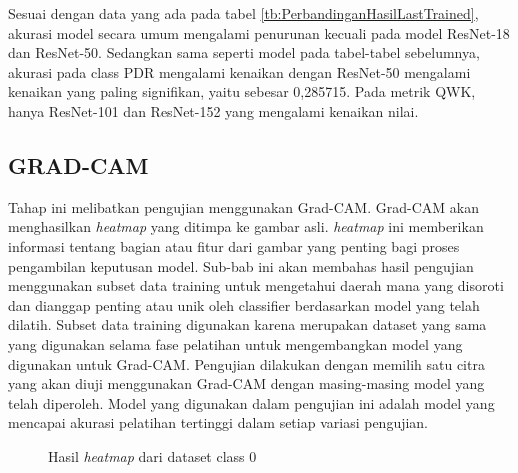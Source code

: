 Sesuai dengan data yang ada pada tabel \ref{tb:PerbandinganHasilLastTrained}, akurasi model secara umum mengalami penurunan kecuali pada model ResNet-18 dan ResNet-50. Sedangkan sama seperti model pada tabel-tabel sebelumnya, akurasi pada class PDR mengalami kenaikan dengan ResNet-50 mengalami kenaikan yang paling signifikan, yaitu sebesar 0,285715. Pada metrik QWK, hanya ResNet-101 dan ResNet-152 yang mengalami kenaikan nilai.

\subsection{GRAD-CAM}
\label{sec:43}
Tahap ini melibatkan pengujian menggunakan Grad-CAM. 
Grad-CAM akan menghasilkan \emph{heatmap} yang ditimpa ke gambar asli. 
\emph{\emph{heatmap}} ini memberikan informasi tentang bagian atau fitur dari gambar yang penting bagi proses pengambilan keputusan model. Sub-bab ini akan membahas hasil pengujian menggunakan subset data training untuk mengetahui daerah mana yang disoroti dan dianggap penting atau unik oleh classifier berdasarkan model yang telah dilatih. Subset data training digunakan karena merupakan dataset yang sama yang digunakan selama fase pelatihan untuk mengembangkan model yang digunakan untuk Grad-CAM. Pengujian dilakukan dengan memilih satu citra yang akan diuji menggunakan Grad-CAM dengan masing-masing model yang telah diperoleh. Model yang digunakan dalam pengujian ini adalah model yang mencapai akurasi pelatihan tertinggi dalam setiap variasi pengujian.

\begin{figure}[hbtp]
	\centering
	\caption{Hasil \emph{\emph{heatmap}} dari dataset class 0}
	\label{fig:GRAD0}
\end{figure}

